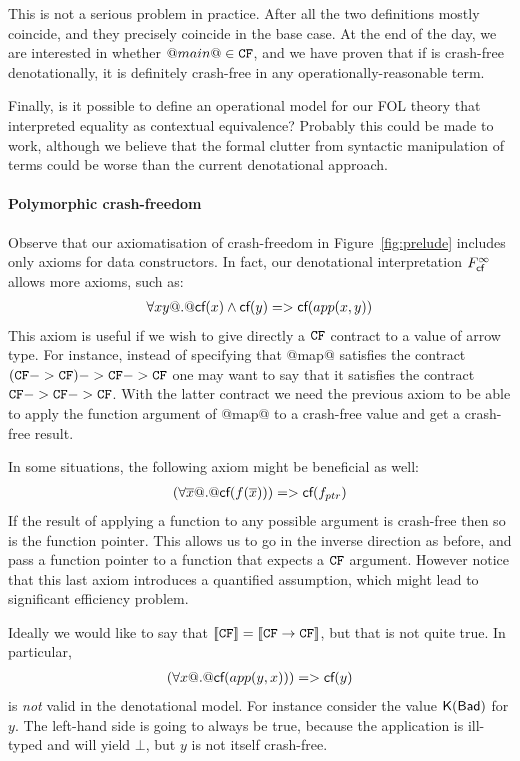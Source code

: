 This is not a serious problem in practice.
After all the two definitions mostly coincide, and
they precisely coincide in the base case.  At the end of the day, we
are interested in whether $@main@ \in {\tt CF}$, and we have proven that if
is crash-free denotationally, it is definitely crash-free in any
operationally-reasonable term.

Finally, is it possible to define an operational model for our FOL theory that interpreted
equality as contextual equivalence? Probably this could be made to work, although we believe
that the formal clutter from syntactic manipulation of terms could be worse than the current
denotational approach. 


\paragraph{Polymorphic crash-freedom}

Observe that our axiomatisation of crash-freedom in Figure~\ref{fig:prelude} 
includes only axioms for data constructors. In fact, our denotational interpretation
$F_{\textsf{cf}}^{\infty}$ allows more axioms, such as:
\[\begin{array}{l}
    \forall x y @.@ \textsf{cf}(x) \land \textsf{cf}(y) => \textsf{cf}(app(x,y))
\end{array}\] 
This axiom is useful if we wish to give directly a ${\tt CF}$ contract to a value of 
arrow type. For instance, instead of specifying that @map@ satisfies the contract
$({\tt CF} -> {\tt CF}) -> {\tt CF} -> {\tt CF}$ one may want to say that it satisfies the contract
${\tt CF} -> {\tt CF} -> {\tt CF}$. With the latter contract we need the previous axiom to be 
able to apply the function argument of @map@ to a crash-free value and get a 
crash-free result. 

In some situations, the following axiom might be beneficial as well:
\[\begin{array}{l}
    (\forall \overline{x} @.@ \textsf{cf}(f(\overline{x}))) => \textsf{cf}(f_{ptr})
\end{array}\]
If the result of applying a function to any possible argument is crash-free then 
so is the function pointer. This allows us to go in the inverse direction as before, 
and pass a function pointer to a function that expects a ${\tt CF}$ argument. However notice
that this last axiom introduces a quantified assumption, which might lead to significant
efficiency problem.

Ideally we would like to say that $[\![{\tt CF}]\!] = [\![{\tt CF} \rightarrow {\tt CF}]\!]$,
but that is not quite true.  In particular, 
\[\begin{array}{l}
   (\forall x @.@ \textsf{cf}(app(y,x))) => \textsf{cf}(y)
\end{array}\]
is {\em not} valid in the denotational model. For instance consider the
value $\mathsf{K}(\mathsf{Bad})$ for $y$. The left-hand side is going to always 
be true, because the application is ill-typed and will yield $\bot$, but $y$ 
is not itself crash-free.


